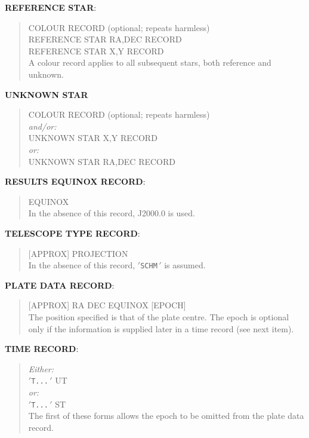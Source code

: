 \goodbreak
{\bf REFERENCE STAR}:

\begin{quote}
 COLOUR RECORD (optional; repeats harmless) \\
 REFERENCE STAR RA,DEC RECORD \\
 REFERENCE STAR X,Y RECORD \\
 A colour record applies to all subsequent stars,
 both reference and unknown.
\end{quote}

\goodbreak
{\bf UNKNOWN STAR}

\begin{quote}
 COLOUR RECORD (optional; repeats harmless) \\
 {\it and/or:} \\
 UNKNOWN STAR X,Y RECORD \\
 {\it or:} \\
 UNKNOWN STAR RA,DEC RECORD
\end{quote}

\goodbreak
{\bf RESULTS EQUINOX RECORD}:

\begin{quote}
 EQUINOX \\
 In the absence of this record, J2000.0 is used.
\end{quote}

\goodbreak
{\bf TELESCOPE TYPE RECORD}:

\begin{quote}
 [APPROX] PROJECTION \\
 In the absence of this record, $'$\verb|SCHM|$\,'$ is assumed.
\end{quote}

\goodbreak
{\bf PLATE DATA RECORD}:

\begin{quote}
 [APPROX] RA DEC EQUINOX [EPOCH] \\
 The position specified is that of the plate centre.
 The epoch is optional only if the information is supplied
 later in a time record (see next item).
\end{quote}

\goodbreak
{\bf TIME RECORD}:

\begin{quote}
 {\it Either:} \\
 $'$\verb|T...|$\,'$ UT \\
 {\it or:} \\
 $'$\verb|T...|$\,'$ ST \\
 The first of these forms allows the epoch to be omitted from
 the plate data record.
\end{quote}

